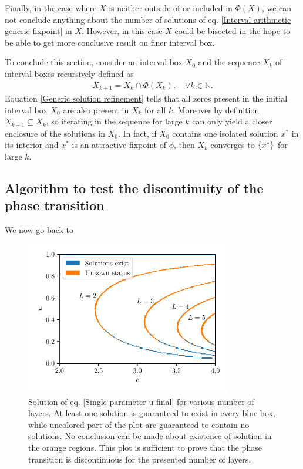 \documentclass[
11pt, %
english, %
singlespacing, %
nolistspacing, %
liststotoc, %
headsepline, %
]{MastersDoctoralThesis} %
\begin{document}
Finally, in the case where $X$ is neither outside of or included in $\Phi(X)$, we can not conclude anything about the number of solutions of eq. \eqref{Interval arithmetic generic fixpoint} in $X$. However, in this case $X$ could be bisected in the hope to be able to get more conclusive result on finer interval box.

To conclude this section, consider an interval box $X_0$ and the sequence $X_k$ of interval boxes recursively defined as
\begin{align}
	X_{k+1} = X_k \cap \Phi(X_k), \quad \forall k \in \mathbb{N}. \label{Generic refinement iteration}
\end{align}
Equation \eqref{Generic solution refinement} tells that all zeros present in the initial interval box $X_0$ are also present in $X_k$ for all $k$. Moreover by definition $X_{k+1} \subseteq X_k$, so iterating in the sequence for large $k$ can only yield a closer enclosure of the solutions in $X_0$. In fact, if $X_0$ contains one isolated solution $x^*$ in its interior and $x^*$ is an attractive fixpoint of $\phi$, then $X_k$ converges to $\{x^*\}$ for large $k$.

\subsection{Algorithm to test the discontinuity of the phase transition}
\label{Section: Discontinuous phase transition}

We now go back to

\begin{figure}
	\includegraphics[width=0.8\textwidth]{multilayer_single_param_ErdosRenyiGraph.pdf}
	\caption{Solution of eq. \eqref{Single parameter u final} for various number of layers. At least one solution is guaranteed to exist in every blue box, while uncolored part of the plot are guaranteed to contain no solutions. No conclusion can be made about existence of solution in the orange regions. This plot is sufficient to prove that the phase transition is discontinuous for the presented number of layers.}
	\label{Figure: Multilayer single parameter ER}
\end{figure}
\end{document}
